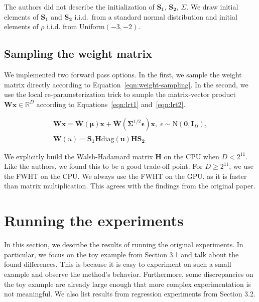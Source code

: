 \documentclass[11pt, twocolumn]{article}
\begin{document}
    The authors did not describe the initialization of $\mathbf{S_1}$, $\mathbf{S_2}$, $\Sigma$.
    We draw initial elements of $\mathbf{S_1}$ and $\mathbf{S_2}$ i.i.d.\ from a standard normal distribution and initial elements of $\rho$ i.i.d. from Uniform$(-3, -2)$.

    \subsection{Sampling the weight matrix}\label{subsec:sampling-the-weight-matrix}
    We implemented two forward pass options.
    In the first, we sample the weight matrix directly according to Equation~\ref{eqn:weight-sampling}.
    In the second, we use the local re-parameterization trick to sample the matrix-vector product $\mathbf{W}\mathbf{x} \in \mathbb{R}^D$ according to Equations~\ref{eqn:lrt1} and~\ref{eqn:lrt2}.

    \begin{align}
        \mathbf{W}\mathbf{x} = \overline{\mathbf{W}}(\mathbf{\mu})\mathbf{x} + \overline{\mathbf{W}}(\mathbf{\Sigma}^{1/2}\mathbf{\epsilon})\mathbf{x}, \; \epsilon \sim \mathrm{N}(\mathbf{0}, \mathbf{I}_D)\label{eqn:lrt1},\\
        \overline{\mathbf{W}}(u) = \mathbf{S_1} \mathbf{H} \mathrm{diag}(\mathbf{u}) \mathbf{H} \mathbf{S_2}\label{eqn:lrt2}
    \end{align}

    We explicitly build the Walsh-Hadamard matrix $\mathbf{H}$ on the CPU when $D < 2^{11}$.
    Like the authors, we found this to be a good trade-off point.
    For $D \ge 2^{11}$, we use the FWHT on the CPU.
    We always use the FWHT on the GPU, as it is faster than matrix multiplication.
    This agrees with the findings from the original paper.

    \section{Running the experiments}\label{sec:running-the-experiments}
    In this section, we describe the results of running the original experiments.
    In particular, we focus on the toy example from Section 3.1 and talk about the found differences.
    This is because it is easy to experiment on such a small example and observe the method's behavior.
    Furthermore, some discrepancies on the toy example are already large enough that more complex experimentation is not meaningful.
    We also list results from regression experiments from Section 3.2.
\end{document}
